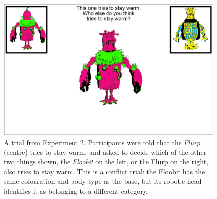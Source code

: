 \begin{figure}[ht]
  \centering
  \includegraphics[width=\figurewidth]{imgs/artificial_screenshot.png}
  \caption[Screen shot from Experiment 2.]{
    A trial from Experiment 2.
    Participants were told that the \emph{Flurp} (centre)
    tries to stay warm, and asked to decide
    which of the other two things shown,
    the \emph{Floobit} on the left, or the Flurp on the right,
    also tries to stay warm.
    This is a conflict trial:
    the Floobit has the same colouration and body type as the base,
    but its robotic head identifies it as belonging to a different category.
    \label{fig:artificial}
  }
\end{figure}


